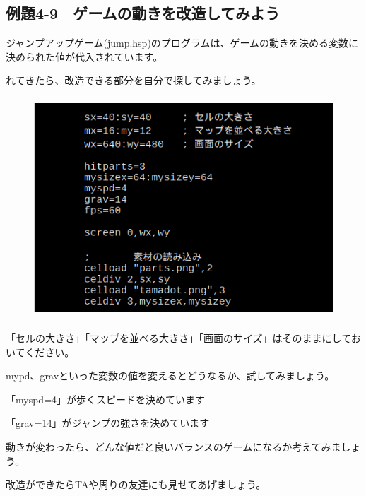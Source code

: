 \newpage
\subsection{例題4-9　ゲームの動きを改造してみよう}

\begin{description}
    \item {}
\end{description}



ジャンプアップゲーム(jump.hsp)のプログラムは、ゲームの動きを決める変数に決められた値が代入されています。

れてきたら、改造できる部分を自分で探してみましょう。



\begin{figure}[H]
    \begin{center}
      \includegraphics[keepaspectratio,width=11.853cm,height=8.266cm]{text04-img/text04-img026.png}
    \end{center}
    \label{fig:prog_menu}
\end{figure}


「セルの大きさ」「マップを並べる大きさ」「画面のサイズ」はそのままにしておいてください。

mypd、gravといった変数の値を変えるとどうなるか、試してみましょう。

\begin{description}
    \item {}
\end{description}

「myspd=4」が歩くスピードを決めています

「grav=14」がジャンプの強さを決めています

動きが変わったら、どんな値だと良いバランスのゲームになるか考えてみましょう。

改造ができたらTAや周りの友達にも見せてあげましょう。


